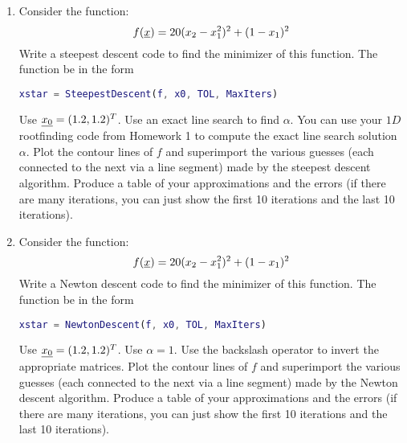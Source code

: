 \documentclass[11pt, oneside]{article}
\begin{document}
\begin{enumerate}
  \item %
    Consider the function:
    \[
      f(\underline{x}) = 20(x_2 - x_1^2)^2 + (1 - x_1)^2
    \]
    Write a \MATLAB steepest descent code to find the minimizer of this function.
    The function be in the form
    \begin{lstlisting}[language=MATLAB, frame=none]
      xstar = SteepestDescent(f, x0, TOL, MaxIters)
    \end{lstlisting}
    Use $\underline{x_0} = (1.2, 1.2)^T$.
    Use an exact line search to find $\alpha$.
    You can use your $1D$ rootfinding code from Homework 1 to compute the exact
    line search solution $\alpha$.
    Plot the contour lines of $f$ and superimport the various guesses (each
    connected to the next via a line segment) made by the steepest descent
    algorithm.
    Produce a table of your approximations and the errors (if there are many
    iterations, you can just show the first 10 iterations and the last 10
    iterations).

  \item %
    Consider the function:
    \[
      f(\underline{x}) = 20(x_2 - x_1^2)^2 + (1 - x_1)^2
    \]
    Write a \MATLAB Newton descent code to find the minimizer of this function.
    The function be in the form
    \begin{lstlisting}[language=MATLAB, frame=none]
      xstar = NewtonDescent(f, x0, TOL, MaxIters)
    \end{lstlisting}
    Use $\underline{x_0} = (1.2, 1.2)^T$.
    Use $\alpha = 1$.
    Use the backslash operator to invert the appropriate matrices.
    Plot the contour lines of $f$ and superimport the various guesses (each
    connected to the next via a line segment) made by the Newton descent
    algorithm.
    Produce a table of your approximations and the errors (if there are many
    iterations, you can just show the first 10 iterations and the last 10
    iterations).

\end{enumerate}
\end{document}

